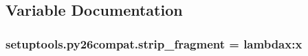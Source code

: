 \subsection{Variable Documentation}
\hypertarget{namespacesetuptools_1_1py26compat_a7004a6d15579920923c72e93005fa073}{}
\subsubsection[{strip\+\_\+fragment}]{\setlength{\rightskip}{0pt plus 5cm}setuptools.\+py26compat.\+strip\+\_\+fragment = lambdax\+:x}\label{namespacesetuptools_1_1py26compat_a7004a6d15579920923c72e93005fa073}
